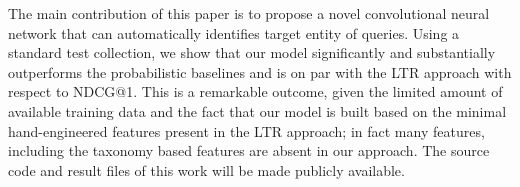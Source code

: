 The main contribution of this paper is to propose a novel convolutional neural network that can automatically identifies target entity of queries. Using a standard test collection, we show that our model  significantly and substantially outperforms the probabilistic baselines and is on par with the LTR approach with respect to NDCG@1. This is a remarkable outcome, given the limited amount of available training data and the fact that our model is built based on the minimal hand-engineered features present in the LTR approach; in fact many features, including the taxonomy based features are absent in our approach. The source code and result files of this work will be made publicly available.





